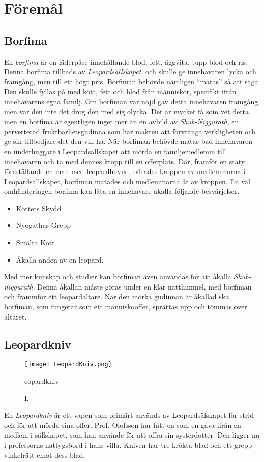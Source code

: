 \section{Föremål}
\subsection{Borfima}
\label{itm:Borrfima}
%
En \textit{borfima} är en läderpåse innehållande blod, fett, äggvita, tupp-blod och ris. Denna borfima tillbads av \textit{Leopardsällskapet}, och skulle ge innehavaren lycka och framgång, men till ett högt pris. Borfiman behövde nämligen ``matas'' så att säga. Den skulle fyllas på med kött, fett och blod från människor, specifikt ifrån innehavarens egna familj. Om borfiman var nöjd gav detta innehavaren framgång, men var den inte det drog den med sig olycka. Det är mycket få som vet detta, men en borfima är egentligen inget mer än en avbild av \textit{Shub-Niggurath}, en perverterad fruktbarhetsgudinna som har makten att förvränga verkligheten och ge sin tillbedjare det den vill ha. När borfiman behövde matas bad innehavaren en underhuggare i Leopardsällskapet att mörda en familjemedlemm till innehavaren och ta med dennes kropp till en offerplats. Där, framför en staty föreställande en man med leopardhuvud, offrades kroppen av medlemmarna i Leopardsällskapet, borfiman matades och medlemmarna åt av kroppen. En väl omhändertagen borfima kan låta en innehavare åkalla följande besvärjelser.
%
\begin{itemize}
	\item Köttets Skydd
	\item Nyogathas Grepp
	\item Smälta Kött
	\item Åkalla anden av en leopard.
\end{itemize}
%
Med mer kunskap och studier kan borfiman även användas för att åkalla \textit{Shub-niggurath}. Denna åkallan måste göras under en klar natthimmel, med borfiman och frammför ett leopardaltare. När den mörka gudinnan är åkallad ska borfiman, som fungerar som ett människooffer, sprättas upp och tömmas över altaret.

\subsection{Leopardkniv}
\label{itm:Leopardkniv}
%
\begin{figure}[h]
\centering
\texttt{[image: LeopardKniv.png]}
\caption Leopardkniv
\end{figure}
%
En \textit{Leopardkniv} är ett vapen som primärt används av Leopardsälskapet för strid och för att mörda sina offer. Prof. Olofsson har fått en som en gåva ifrån en medlem i sällskapet, som han använde för att offra sin systerdotter. Den ligger nu i professorns nattygsbord i hans villa. Kniven har tre krökta blad och ett grepp vinkelrätt emot dess blad.
